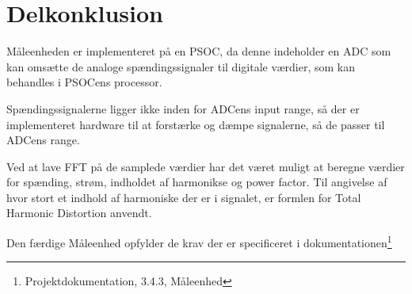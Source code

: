 
\section{Delkonklusion}

Måleenheden er implementeret på en PSOC, da denne indeholder en ADC som kan omsætte de analoge spændingssignaler til digitale værdier, som kan behandles i PSOCens processor. 

Spændingssignalerne ligger ikke inden for ADCens input range, så der er implementeret hardware til at forstærke og dæmpe signalerne, så de passer til ADCens range. 

Ved at lave FFT på de samplede værdier har det været muligt at beregne værdier for spænding, strøm, indholdet af harmonikse og power factor. Til angivelse af hvor stort et indhold af harmoniske der er i signalet, er formlen for Total Harmonic Distortion anvendt.

Den færdige Måleenhed opfylder de krav der er specificeret i dokumentationen\footnote{Projektdokumentation, 3.4.3, Måleenhed}

